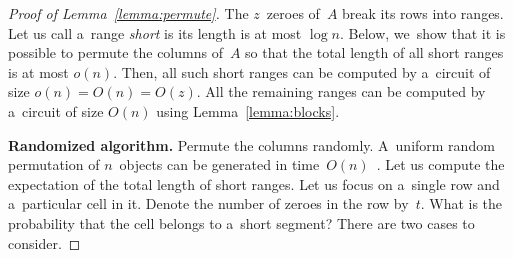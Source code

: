 \begin{proof}[Proof of Lemma~\ref{lemma:permute}]
The $z$~zeroes of~$A$ break its rows into ranges.
Let us call a~range {\em short} is its length is at most $\log n$.
Below, we~show that it is possible to permute the columns of~$A$
so that the total length of all short ranges is at most $o(n)$.
Then, all such short ranges can be computed by a~circuit of size
$o(n)=O(n)=O(z)$. All the remaining ranges can be
computed by a~circuit of size $O(n)$ using Lemma~\ref{lemma:blocks}.


\textbf{Randomized algorithm.}
Permute the columns randomly. A~uniform random permutation
of $n$~objects can be generated in
time~$O(n)$~\cite[Algorithm~P (Shuffling)]{DBLP:books/lib/Knuth98}.
Let us compute the expectation of
the total length of short ranges.
Let us focus on a~single row and a~particular cell in it. Denote the number of
zeroes in the row by~$t$. What is the probability that the cell belongs to
a~short segment? There are two cases to consider.



\end{proof}

